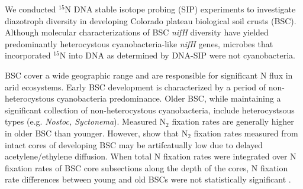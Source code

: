 We conducted $^{15}$N DNA stable isotope probing (SIP) experiments to investigate diazotroph diversity in developing Colorado plateau biological soil crusts (BSC). Although molecular characterizations of BSC \textit{nifH} diversity have yielded predominantly heterocystous cyanobacteria-like \textit{nifH} genes, microbes that incorporated $^{15}$N into DNA as determined by DNA-SIP were not cyanobacteria.

BSC cover a wide geographic range and are responsible for significant N flux in arid ecosystems. Early BSC development is characterized by a period of non-heterocystous cyanobacteria predominance. Older BSC, while maintaining a significant collection of non-heterocystous cyanobacteria, include heterocystsous types (e.g. \textit{Nostoc, Syctonema}). Measured N$_{2}$ fixation rates are generally higher in older BSC than younger. However, \citet{15643930} show that N$_{2}$ fixation rates measured from intact cores of developing BSC may be artifcatually low due to delayed acetylene/ethylene diffusion. When total N fixation rates were integrated over N fixation rates of BSC core subsections along the depth of the cores, N fixation rate differences between young and old BSCs were not statistically significant \cite{15643930}.


